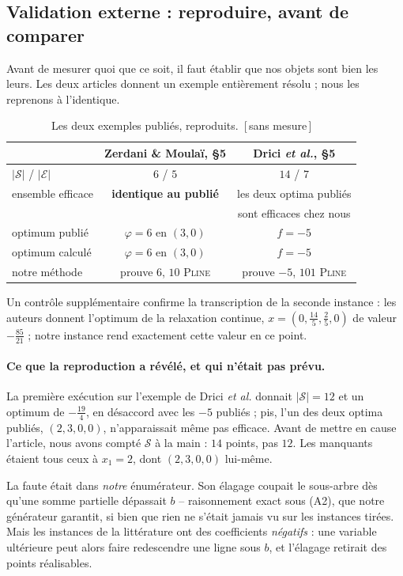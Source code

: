 \documentclass[11pt,a4paper]{article}
\theoremstyle{plain}
\theoremstyle{remark}
\newcommand{\Ecal}{\mathcal{E}}
\newcommand{\Scal}{\mathcal{S}}
\newcommand{\ILP}{\textsc{Pline}}
\newcommand{\confna}{\textsf{\footnotesize[\,sans mesure\,]}}
\begin{document}
\subsection{Validation externe : reproduire, avant de comparer}
\label{sec:externe}

Avant de mesurer quoi que ce soit, il faut établir que nos objets sont bien
les leurs. Les deux articles donnent un exemple entièrement résolu ; nous
les reprenons à l'identique.

\begin{table}[H]
\centering
\caption{Les deux exemples publiés, reproduits.\ \confna}
\label{tab:exemples}
\begin{tabular}{lcc}
\toprule
& Zerdani \& Moulaï, \S5 & Drici \emph{et al.}, \S5\\
\midrule
$|\Scal|$ / $|\Ecal|$ & $6$ / $5$ & $14$ / $7$\\
ensemble efficace & \textbf{identique au publié} & les deux optima publiés\\
                  &                              & sont efficaces chez nous\\
optimum publié & $\varphi=6$ en $(3,0)$ & $f=-5$\\
optimum calculé & $\varphi=6$ en $(3,0)$ & $f=-5$\\
notre méthode & prouve $6$, $10$ \ILP & prouve $-5$, $101$ \ILP\\
\bottomrule
\end{tabular}
\end{table}

\noindent
Un contrôle supplémentaire confirme la transcription de la seconde instance :
les auteurs donnent l'optimum de la relaxation continue, $x=(0,\frac{14}{5},
\frac{2}{5},0)$ de valeur $-\frac{85}{21}$ ; notre instance rend exactement
cette valeur en ce point.

\paragraph{Ce que la reproduction a révélé, et qui n'était pas prévu.} La
première exécution sur l'exemple de Drici \emph{et al.} donnait $|\Scal|=12$
et un optimum de $-\frac{19}{4}$, en désaccord avec les $-5$ publiés ; pis,
l'un des deux optima publiés, $(2,3,0,0)$, n'apparaissait même pas efficace.
Avant de mettre en cause l'article, nous avons compté $\Scal$ à la main :
$14$ points, pas $12$. Les manquants étaient tous ceux à $x_1=2$, dont
$(2,3,0,0)$ lui-même.

La faute était dans \emph{notre} énumérateur. Son élagage coupait le
sous-arbre dès qu'une somme partielle dépassait $b$ -- raisonnement exact
sous (A2), que notre générateur garantit, si bien que rien ne s'était jamais
vu sur les instances tirées. Mais les instances de la littérature ont des
coefficients \emph{négatifs} : une variable ultérieure peut alors faire
redescendre une ligne sous $b$, et l'élagage retirait des points réalisables.
\end{document}
